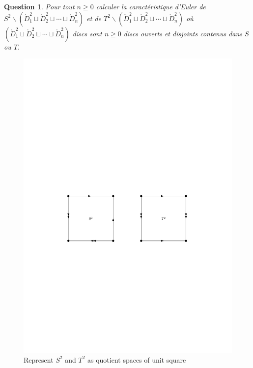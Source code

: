 \documentclass[]{article}
\newtheorem{prop}{Question}
\theoremstyle{remark}
\begin{document}
\begin{prop}
Pour tout $n \geqslant 0$ calculer la caractéristique d'Euler de $S^{2} \backslash\left(\mathring{D}_{1}^{2} \sqcup \mathring{D}_{2}^{2} \sqcup \cdots \sqcup \mathring{D}_{n}^{2}\right)$ et de $T^{2} \backslash\left(\mathring{D}_{1}^{2} \sqcup \mathring{D}_{2}^{2} \sqcup \cdots \sqcup \mathring{D}_{n}^{2}\right)$ où $\left(\mathring{D}_{1}^{2} \sqcup \mathring{D}_{2}^{2} \sqcup \cdots \sqcup \mathring{D}_{n}^{2}\right)$ discs sont $n \geqslant 0$ discs ouverts et disjoints contenus dans $S$ ou $T .$
\end{prop}
\begin{figure}
	\centering
	\includegraphics[width=0.7\linewidth]{square_representation}
	\caption{Represent $ S^2 $ and $ T^2 $ as quotient spaces of unit square} \label{fig:squarerepresentation}
\end{figure}
\end{document}
